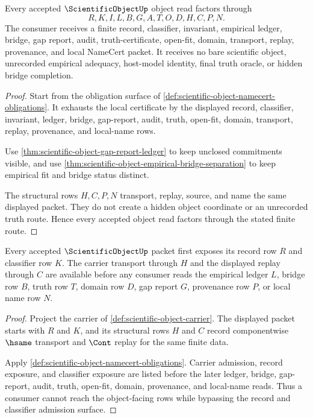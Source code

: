 \begin{theorem}
\label{thm:scientific-object-namecert-surface}
Every accepted $\ScientificObjectUp$ object read factors through
$$
R,K,I,L,B,G,A,T,O,D,H,C,P,N.
$$
The consumer receives a finite record, classifier, invariant, empirical ledger, bridge, gap report, audit, truth-certificate, open-fit, domain, transport, replay, provenance, and local NameCert packet. It receives no bare scientific object, unrecorded empirical adequacy, host-model identity, final truth oracle, or hidden bridge completion.
\end{theorem}
\begin{proof}
Start from the obligation surface of \autoref{def:scientific-object-namecert-obligations}. It exhausts the local certificate by the displayed record, classifier, invariant, ledger, bridge, gap-report, audit, truth, open-fit, domain, transport, replay, provenance, and local-name rows.

Use \autoref{thm:scientific-object-gap-report-ledger} to keep unclosed commitments visible, and use \autoref{thm:scientific-object-empirical-bridge-separation} to keep empirical fit and bridge status distinct.

The structural rows $H,C,P,N$ transport, replay, source, and name the same displayed packet. They do not create a hidden object coordinate or an unrecorded truth route. Hence every accepted object read factors through the stated finite route.
\end{proof}

\begin{theorem}
\label{thm:scientific-object-record-classifier-admission}
Every accepted $\ScientificObjectUp$ packet first exposes its record row $R$ and classifier row $K$. The carrier transport through $H$ and the displayed replay through $C$ are available before any consumer reads the empirical ledger $L$, bridge row $B$, truth row $T$, domain row $D$, gap report $G$, provenance row $P$, or local name row $N$.
\end{theorem}
\begin{proof}
Project the carrier of \autoref{def:scientific-object-carrier}. The displayed packet starts with $R$ and $K$, and its structural rows $H$ and $C$ record componentwise $\hsame$ transport and $\Cont$ replay for the same finite data.

Apply \autoref{def:scientific-object-namecert-obligations}. Carrier admission, record exposure, and classifier exposure are listed before the later ledger, bridge, gap-report, audit, truth, open-fit, domain, provenance, and local-name reads. Thus a consumer cannot reach the object-facing rows while bypassing the record and classifier admission surface.
\end{proof}

